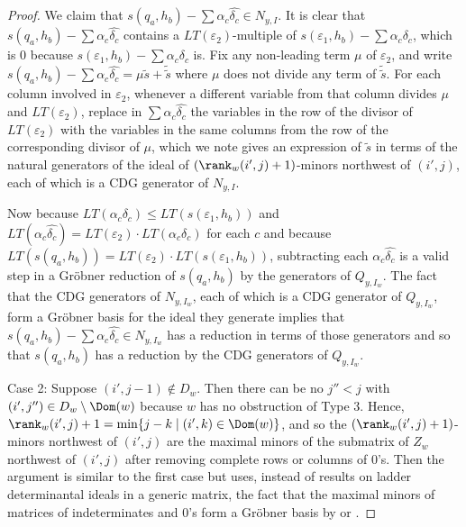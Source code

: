 \begin{proof}
We claim that $s(q_a,h_b)-\sum \alpha_c \widehat{\delta_c} \in N_{y,I}$.  It is clear that $s(q_a,h_b)-\sum \alpha_c \widehat{\delta_c}$ contains a $LT(\varepsilon_2)$-multiple of $s(\varepsilon_1,h_b)-\sum \alpha_c \delta_c$, which is $0$ because $s(\varepsilon_1,h_b)-\sum \alpha_c \delta_c$ is.  Fix any non-leading term $\mu$ of $\varepsilon_2$, and write $s(q_a,h_b)-\sum \alpha_c \widehat{\delta_c} = \mu \tilde{s}+\tilde{\tilde{s}}$ where $\mu$ does not divide any term of $\tilde{\tilde{s}}$.  For each column involved in $\varepsilon_2$, whenever a different variable from that column divides $\mu$ and $LT(\varepsilon_2)$, replace in $\sum \alpha_c \widehat{\delta_c}$ the variables in the row of the divisor of $LT(\varepsilon_2)$ with the variables in the same columns from the row of the corresponding divisor of $\mu$, which we note gives an expression of $\tilde{s}$ in terms of the natural generators of the ideal of $(\rank_w(i',j)+1)$-minors northwest of $(i',j)$, each of which is a CDG generator of $N_{y,I}$.

Now because $LT(\alpha_c\delta_c) \leq LT(s(\varepsilon_1,h_b))$ and $LT(\alpha_c \widehat{\delta_c}) = LT(\varepsilon_2) \cdot LT(\alpha_c\delta_c)$ for each $c$ and because $LT(s(q_a,h_b)) = LT(\varepsilon_2) \cdot LT(s(\varepsilon_1,h_b))$, subtracting each $\alpha_c \widehat{\delta_c}$ is a valid step in a Gr\"obner reduction of $s(q_a,h_b)$ by the generators of $Q_{y,I_w}$.  The fact that the CDG generators of $N_{y,I_w}$, each of which is a CDG generator of $Q_{y,I_w}$, form a Gr\"obner basis for the ideal they generate implies that $s(q_a,h_b)-\sum \alpha_c \widehat{\delta_c} \in N_{y,I_w}$ has a reduction in terms of those generators and so that $s(q_a,h_b)$ has a reduction by the CDG generators of $Q_{y,I_w}$.

Case 2: Suppose $(i',j-1) \notin D_w$.  Then there can be no $j''<j$ with $(i',j'') \in D_w\setminus \Dom(w)$ because $w$ has no obstruction of Type $3$.  Hence, $\rank_w(i',j)+1 = \min\{j-k \mid (i',k) \in \Dom(w)\}$, and so the $(\rank_w(i',j)+1)$-minors northwest of $(i',j)$ are the maximal minors of the submatrix of $Z_w$ northwest of $(i',j)$ after removing complete rows or columns of $0$'s.  Then the argument is similar to the first case but uses, instead of results on ladder determinantal ideals in a generic matrix, the fact that the maximal minors of matrices of indeterminates and $0$'s form a Gr\"obner basis by \cite[Theorem 4.2]{CDG15} or \cite[Proposition 5.4]{Boo11}.  
\end{proof}
